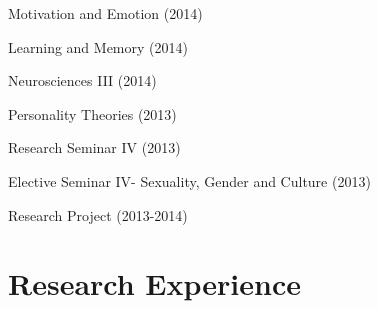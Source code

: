 \documentclass[11pt,a4paper,]{awesome-cv}
\begin{document}
\begin{cventries}
{\begin{cvitems}
\item Motivation and Emotion (2014)
\item Learning and Memory (2014)
\item Neurosciences III (2014)
\item Personality Theories (2013)
\item Research Seminar IV (2013)
\item Elective Seminar IV- Sexuality, Gender and Culture (2013)
\item Research Project (2013-2014)
\end{cvitems}}
\end{cventries}

\hypertarget{research-experience}{%
\section{Research Experience}\label{research-experience}}
\end{document}
